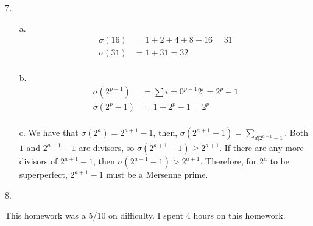 \documentclass[11pt]{article}
\begin{document}
\begin{flushleft}
7.
\end{flushleft}
\begin{enumerate}
    \item [a.]
        \begin{align*}
            \sigma(16)&=1+2+4+8+16=31\\
            \sigma(31)&=1+31=32\\
        \end{align*}
    \item [b.]
        \begin{align*}
            \sigma(2^{p-1})&=\sum{i=0}^{p-1}2^i=2^p-1\\
            \sigma(2^{p}-1)&=1+2^p-1=2^p\\
        \end{align*}
    \item [c.]
        We have that $\sigma(2^a)=2^{a+1}-1$, then, $\sigma(2^{a+1}-1)=\sum_{d\vert 2^{a+1}-1}$.
        Both $1$ and $2^{a+1}-1$ are divisors, so $\sigma(2^{a+1}-1)\geq 2^{a+1}$. If there are
        any more divisors of $2^{a+1}-1$, then $\sigma(2^{a+1}-1)>2^{a+1}$. Therefore, for
        $2^a$ to be superperfect, $2^{a+1}-1$ must be a Mersenne prime.

\end{enumerate}

\begin{flushleft}
8.
\end{flushleft}
This homework was a 5/10 on difficulty. I spent 4 hours on this homework.
\end{document}
